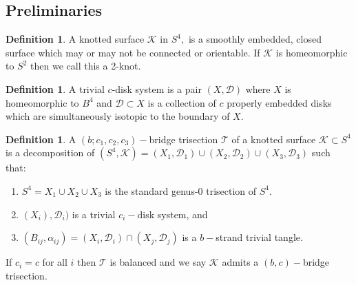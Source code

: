 \documentclass{amsart}
\theoremstyle{definition}
\newtheorem{definition}[theorem]{Definition}
\begin{document}
\subsection{Preliminaries}
\begin{definition}
A knotted surface $\mathcal{K}$ in $S^{4},$ is a smoothly embedded, closed surface which may or may not be connected or orientable. If $\mathcal{K}$ is homeomorphic to $S^{2}$ then we call this a 2-knot.
\end{definition}
\begin{definition}
A trivial $c$-disk system is a pair $(X, \mathcal{D})$ where $X$ is homeomorphic to $B^{4}$ and $\mathcal{D} \subset X$ is a collection of $c$ properly embedded disks which are simultaneously isotopic to the boundary of $X$.
\end{definition}
\begin{definition}
A $(b; c_{1}, c_{2}, c_{3})-$bridge trisection $\mathcal{T}$ of a knotted surface $\mathcal{K} \subset S^{4}$ is a decomposition of $(S^{4}, \mathcal{K}) = (X_{1}, \mathcal{D}_{1}) \cup (X_{2}, \mathcal{D}_{2}) \cup (X_{3}, \mathcal{D}_{3})$ such that:
\begin{enumerate}
\item $S^{4} = X_{1} \cup X_{2} \cup X_{3}$ is the standard genus-0 trisection of $S^{4}.$
\item $(X_{i}), \mathcal{D}_{i})$ is a trivial $c_{i}-$disk system, and
\item $(B_{ij}, \alpha_{ij}) = (X_{i}, \mathcal{D}_{i}) \cap (X_{j}, \mathcal{D}_{j})$ is a $b-$strand trivial tangle.
\end{enumerate}
If $c_{i} = c$ for all $i$ then $\mathcal{T}$ is balanced and we say $\mathcal{K}$ admits a $(b, c)-$bridge trisection.
\end{definition} 
\end{document}
